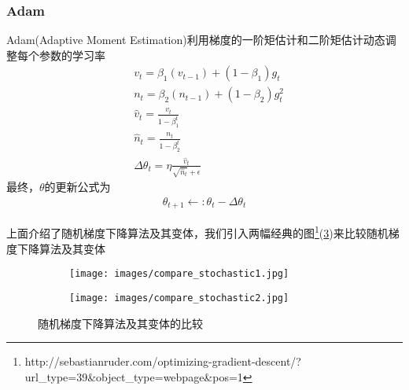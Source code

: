         \subsubsection{Adam}
            \par
            Adam(Adaptive Moment Estimation)利用梯度的一阶矩估计和二阶矩估计动态调整每个参数的学习率
            \begin{align*}
            &v_t = \beta_1(v_{t-1})+(1-\beta_1)g_t\\
            &n_t = \beta_2(n_{t-1})+(1-\beta_2)g_t^2\\
            &\hat{v}_t = \frac{v_t}{1-\beta_1^t}\\
            &\hat{n}_t = \frac{n_t}{1-\beta_2^t}\\
            &\Delta \theta_t = \eta \frac{\hat{v}_t}{\sqrt{\hat{n}_t}+\epsilon}
            \end{align*}
            最终，$\theta$的更新公式为
            \begin{align*}
            \theta_{t+1} \leftarrow:\theta_t - \Delta \theta_t
            \end{align*}
        \par
        上面介绍了随机梯度下降算法及其变体，我们引入两幅经典的图\footnote{http://sebastianruder.com/optimizing-gradient-descent/?url\_type=39\&object\_type=webpage\&pos=1}(\ref{fig:随机梯度下降算法及其变体的比较})来比较随机梯度下降算法及其变体
           \begin{figure}[H]
               \centering
               \begin{subfigure}[b]{0.4\textwidth}
                   \texttt{[image: images/compare\_stochastic1.jpg]}
                   \caption{}
                   \label{fig:图1}
               \end{subfigure}
               \begin{subfigure}[b]{0.4\textwidth}
                   \texttt{[image: images/compare\_stochastic2.jpg]}
                   \caption{}
                   \label{fig:图2}
               \end{subfigure}
               \caption{随机梯度下降算法及其变体的比较}
               \label{fig:随机梯度下降算法及其变体的比较}
           \end{figure}
% 

